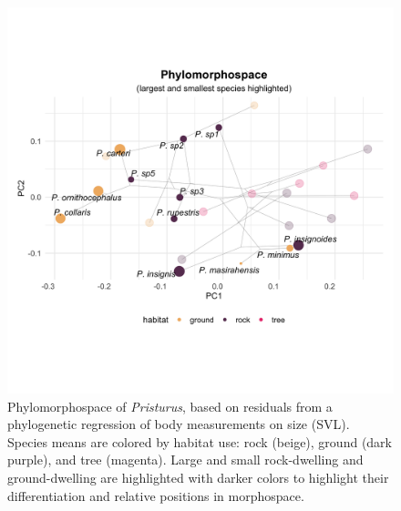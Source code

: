 \documentclass[
]{article}
\begin{document}
\newpage

\begin{figure}
\includegraphics[width=1\linewidth]{Figs/phylomorphospace_large_small} \caption{Phylomorphospace of \textit{Pristurus}, based on residuals from a phylogenetic regression of body measurements on size (SVL). Species means are colored by habitat use: rock (beige), ground (dark purple), and tree (magenta). Large and small rock-dwelling and ground-dwelling are highlighted with darker colors to highlight their differentiation and relative positions in morphospace.}\label{fig:unnamed-chunk-6}
\end{figure}
\end{document}
